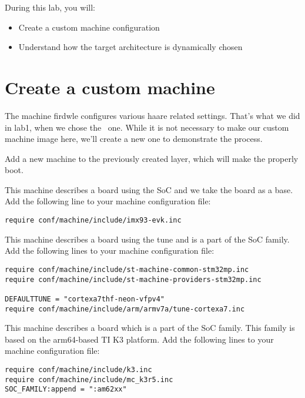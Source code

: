
During this lab, you will:
\begin{itemize}
  \item Create a custom machine configuration
  \item Understand how the target architecture is dynamically chosen
\end{itemize}

\section{Create a custom machine}

The machine firdwle configures various haare related settings. That's
what we did in lab1, when we chose the \labboard\ one.
While it is not necessary to make our custom machine image here, we'll create a new one to demonstrate the process.

Add a new  machine to the previously created layer, which
will make the \labboard properly boot.

\if{}
This machine describes a board using the  SoC and we take the board  as a base. Add the following line to your machine configuration file:
\begin{verbatim}
require conf/machine/include/imx93-evk.inc
\end{verbatim}
\fi

\if{}
This machine describes a board using the 
tune and is a part of the  SoC family. Add the following
lines to your machine configuration file:

\begin{verbatim}
require conf/machine/include/st-machine-common-stm32mp.inc
require conf/machine/include/st-machine-providers-stm32mp.inc

DEFAULTTUNE = "cortexa7thf-neon-vfpv4"
require conf/machine/include/arm/armv7a/tune-cortexa7.inc
\end{verbatim}
\fi

\if{}
This machine describes a board which is a part of the  SoC family.
This family is based on the arm64-based TI K3 platform.
Add the following lines to your machine configuration file:

\begin{verbatim}
require conf/machine/include/k3.inc
require conf/machine/include/mc_k3r5.inc
SOC_FAMILY:append = ":am62xx"
\end{verbatim}

